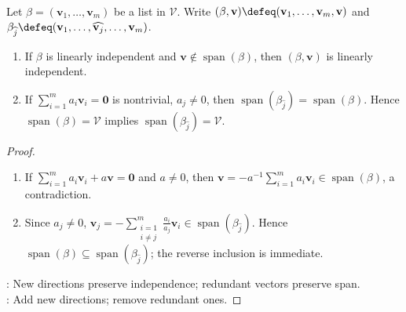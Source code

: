 \begin{proposition} \label{prop:adjoiningandremovingvectors} \\
Let $\beta=(\mathbf{v}_1,\ldots,\mathbf{v}_m)$ be a list in $\mathcal{V}$. Write $(\beta,\mathbf{v})\defeq(\mathbf{v}_1,\ldots,\mathbf{v}_m,\mathbf{v})$ and $\beta_{\widehat{j}}\defeq(\mathbf{v}_1,\ldots,\widehat{\mathbf{v}_j},\ldots,\mathbf{v}_m)$.
\begin{enumerate}[label=(\roman*)]
\setlength{\itemsep}{0pt}
\item If $\beta$ is linearly independent and $\mathbf{v}\notin\operatorname{span}(\beta)$, then $(\beta,\mathbf{v})$ is linearly independent.
\item If $\sum\limits_{i=1}^m a_i\mathbf{v}_i=\mathbf{0}$ is nontrivial, $a_j\neq 0$, then $\operatorname{span}(\beta_{\widehat{j}})=\operatorname{span}(\beta)$. Hence $\operatorname{span}(\beta)=\mathcal{V}$ implies $\operatorname{span}(\beta_{\widehat{j}})=\mathcal{V}$.
\end{enumerate}
\begin{proof}
\begin{enumerate}[label=(\roman*)]
\setlength{\itemsep}{0pt}
\item If $\sum\limits_{i=1}^m a_i\mathbf{v}_i+a\mathbf{v}=\mathbf{0}$ and $a\neq0$, then $\mathbf{v}=-a^{-1}\sum\limits_{i=1}^m a_i\mathbf{v}_i\in\operatorname{span}(\beta)$, a contradiction.
\item Since $a_j\neq0$, $\mathbf{v}_j=-\sum\limits_{\substack{i=1\\i\neq j}}^m\frac{a_i}{a_j}\mathbf{v}_i\in\operatorname{span}(\beta_{\widehat{j}})$. Hence $\operatorname{span}(\beta)\subseteq\operatorname{span}(\beta_{\widehat{j}})$; the reverse inclusion is immediate.\\
\end{enumerate}
: New directions preserve independence; redundant vectors preserve span.\\
: Add new directions; remove redundant ones.
\end{proof}
\end{proposition}

